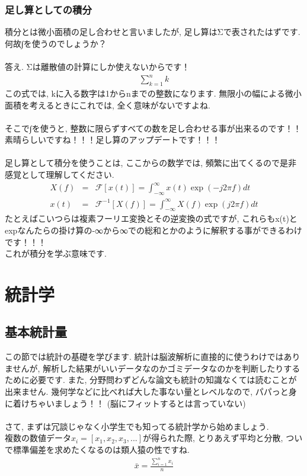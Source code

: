 \documentclass[11pt,a4paper]{jreport}
\begin{document}
\subsubsection{足し算としての積分}
積分とは微小面積の足し合わせと言いましたが, 足し算はΣで表されたはずです. 何故∫を使うのでしょうか？\\
\\
答え. Σは離散値の計算にしか使えないからです！\\
\begin{eqnarray}
\sum_{k=1}^{n} k
\end{eqnarray}
この式では, kに入る数字は1からnまでの整数になります. 無限小の幅による微小面積を考えるときにこれでは, 全く意味がないですよね.\\
\\
そこで∫を使うと, 整数に限らずすべての数を足し合わせる事が出来るのです！！\\
素晴らしいですね！！！足し算のアップデートです！！！\\
\\
足し算として積分を使うことは, ここからの数学では, 頻繁に出てくるので是非感覚として理解してください.
\begin{eqnarray}
X(f) &=& \mathcal{F}[x(t)] = \int^{\infty}_{-\infty}x(t)\exp(-j2\pi f)dt \\
 x(t) &=& \mathcal{F}^{-1}[X(f)] = \int^{\infty}_{-\infty}X(f)\exp(j2\pi f)dt 
\end{eqnarray}
たとえばこいつらは複素フーリエ変換とその逆変換の式ですが, これらもx(t)とexpなんたらの掛け算の-∞から∞での総和とかのように解釈する事ができるわけです！！！\\
これが積分を学ぶ意味です.

\section{統計学}
\subsection{基本統計量}
この節では統計の基礎を学びます. 統計は脳波解析に直接的に使うわけではありませんが, 解析した結果がいいデータなのかゴミデータなのかを判断したりするために必要です. また, 分野問わずどんな論文も統計の知識なくては読むことが出来ません. 幾何学などに比べれば大した事ない量とレベルなので, パパっと身に着けちゃいましょう！！ (脳にフィットするとは言っていない)\\
\\
さて, まずは冗談じゃなく小学生でも知ってる統計学から始めましょう.\\
複数の数値データ$x_i = [x_1, x_2, x_3, ...]$が得られた際, とりあえず平均と分散, ついで標準偏差を求めたくなるのは類人猿の性ですね.\\
\begin{eqnarray}
\label{eq:ave}
\bar{x} = \frac{\sum_{i=1}^{n} x_i}{n}
\end{eqnarray}
\end{document}

